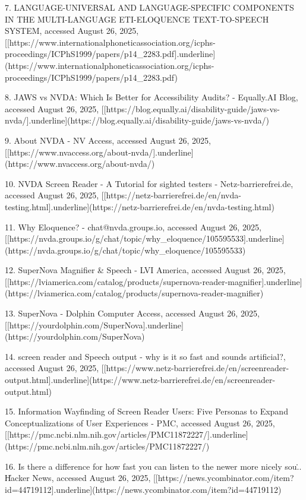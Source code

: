 7.  LANGUAGE-UNIVERSAL AND LANGUAGE-SPECIFIC COMPONENTS IN THE
    MULTI-LANGUAGE ETI-ELOQUENCE TEXT-TO-SPEECH SYSTEM, accessed August
    26, 2025,
    [[https://www.internationalphoneticassociation.org/icphs-proceedings/ICPhS1999/papers/p14_2283.pdf]{.underline}](https://www.internationalphoneticassociation.org/icphs-proceedings/ICPhS1999/papers/p14_2283.pdf)

8.  JAWS vs NVDA: Which Is Better for Accessibility Audits? - Equally.AI
    Blog, accessed August 26, 2025,
    [[https://blog.equally.ai/disability-guide/jaws-vs-nvda/]{.underline}](https://blog.equally.ai/disability-guide/jaws-vs-nvda/)

9.  About NVDA - NV Access, accessed August 26, 2025,
    [[https://www.nvaccess.org/about-nvda/]{.underline}](https://www.nvaccess.org/about-nvda/)

10. NVDA Screen Reader - A Tutorial for sighted testers -
    Netz-barrierefrei.de, accessed August 26, 2025,
    [[https://netz-barrierefrei.de/en/nvda-testing.html]{.underline}](https://netz-barrierefrei.de/en/nvda-testing.html)

11. Why Eloquence? - chat@nvda.groups.io, accessed August 26, 2025,
    [[https://nvda.groups.io/g/chat/topic/why_eloquence/105595533]{.underline}](https://nvda.groups.io/g/chat/topic/why_eloquence/105595533)

12. SuperNova Magnifier & Speech - LVI America, accessed August 26,
    2025,
    [[https://lviamerica.com/catalog/products/supernova-reader-magnifier]{.underline}](https://lviamerica.com/catalog/products/supernova-reader-magnifier)

13. SuperNova - Dolphin Computer Access, accessed August 26, 2025,
    [[https://yourdolphin.com/SuperNova]{.underline}](https://yourdolphin.com/SuperNova)

14. screen reader and Speech output - why is it so fast and sounds
    artificial?, accessed August 26, 2025,
    [[https://www.netz-barrierefrei.de/en/screenreader-output.html]{.underline}](https://www.netz-barrierefrei.de/en/screenreader-output.html)

15. Information Wayfinding of Screen Reader Users: Five Personas to
    Expand Conceptualizations of User Experiences - PMC, accessed August
    26, 2025,
    [[https://pmc.ncbi.nlm.nih.gov/articles/PMC11872227/]{.underline}](https://pmc.ncbi.nlm.nih.gov/articles/PMC11872227/)

16. Is there a difference for how fast you can listen to the newer more
    nicely sou\... \| Hacker News, accessed August 26, 2025,
    [[https://news.ycombinator.com/item?id=44719112]{.underline}](https://news.ycombinator.com/item?id=44719112)

